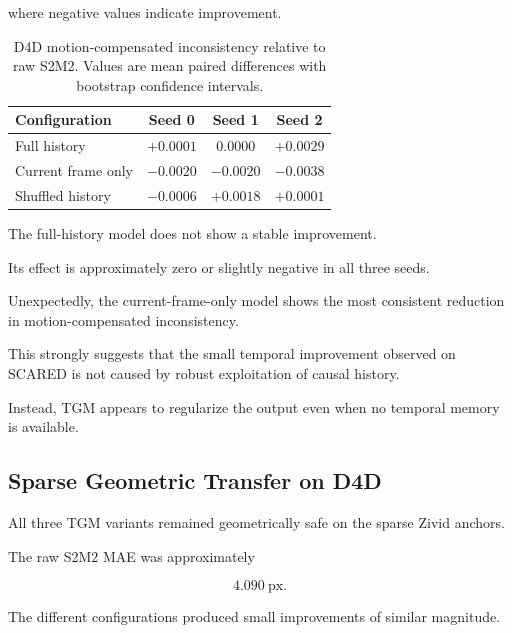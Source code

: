 \documentclass[11pt,a4paper]{article}
\begin{document}
where negative values indicate improvement.

\begin{table}[h]
\centering
\caption{D4D motion-compensated inconsistency relative to raw S2M2.
Values are mean paired differences with bootstrap confidence intervals.}
\small
\begin{tabular}{lccc}
\toprule
\textbf{Configuration}
& \textbf{Seed 0}
& \textbf{Seed 1}
& \textbf{Seed 2} \\
\midrule
Full history
& $+0.0001$
& $0.0000$
& $+0.0029$ \\

Current frame only
& $-0.0020$
& $-0.0020$
& $-0.0038$ \\

Shuffled history
& $-0.0006$
& $+0.0018$
& $+0.0001$ \\
\bottomrule
\end{tabular}
\end{table}

The full-history model does not show a stable improvement.

Its effect is approximately zero or slightly negative in all three seeds.

Unexpectedly, the current-frame-only model shows the most consistent reduction in
motion-compensated inconsistency.

This strongly suggests that the small temporal improvement observed on SCARED is
not caused by robust exploitation of causal history.

Instead, TGM appears to regularize the output even when no temporal memory is
available.

\subsection{Sparse Geometric Transfer on D4D}

All three TGM variants remained geometrically safe on the sparse Zivid anchors.

The raw S2M2 MAE was approximately

\begin{equation}
4.090\ \mathrm{px}.
\end{equation}

The different configurations produced small improvements of similar magnitude.
\end{document}
